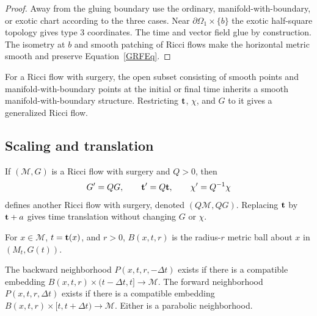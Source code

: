 \begin{proof}
\sketch
{}
Away from the gluing boundary use the ordinary, manifold-with-boundary, or
exotic chart according to the three cases. Near
$\partial\Omega_1\times\{b\}$ the exotic half-square topology gives type 3
coordinates. The time and vector field glue by construction. The isometry at
$b$ and smooth patching of Ricci flows make the horizontal metric smooth and
preserve Equation~\eqref{GRFEq}.
\end{proof}

\begin{proposition}
\label{prop:interior-generalized-ricci-flow}

For a Ricci flow with surgery, the open subset consisting of smooth points and
manifold-with-boundary points at the initial or final time inherits a smooth
manifold-with-boundary structure. Restricting ${\bf t}$, $\chi$, and $G$ to it
gives a generalized Ricci flow.
\end{proposition}

\subsection{Scaling and translation}

If $({\mathcal M},G)$ is a Ricci flow with surgery and $Q>0$, then
\[
  G'=QG,\qquad {\bf t}'=Q{\bf t},\qquad \chi'=Q^{-1}\chi
\]
defines another Ricci flow with surgery, denoted $(Q{\mathcal M},QG)$. Replacing
${\bf t}$ by ${\bf t}+a$ gives time translation without changing $G$ or $\chi$.

\begin{definition}
\label{def:metric-ball-spacetime}

For $x\in{\mathcal M}$, $t={\bf t}(x)$, and $r>0$,
$B(x,t,r)$ is the radius-$r$ metric ball about $x$ in $(M_t,G(t))$.
\end{definition}

\begin{definition}
\label{def:parabolic-neighborhood-surgery}

The backward neighborhood $P(x,t,r,-\Delta t)$ exists if there is a compatible
embedding $B(x,t,r)\times(t-\Delta t,t]\to{\mathcal M}$. The forward
neighborhood $P(x,t,r,\Delta t)$ exists if there is a compatible embedding
$B(x,t,r)\times[t,t+\Delta t)\to{\mathcal M}$. Either is a parabolic
neighborhood.
\end{definition}

